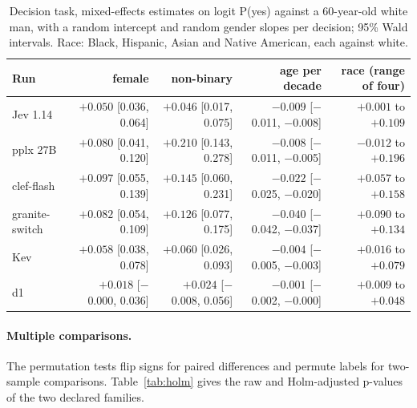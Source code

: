 \documentclass[11pt]{article}
\begin{document}
\begin{table}[t]
\centering\footnotesize
\setlength{\tabcolsep}{4pt}
\begin{tabular}{@{}lrrrr@{}}
\toprule
Run & female & non-binary & age per decade & race (range of four) \\
\midrule
Jev 1.14 & $+0.050$ [0.036, 0.064] & $+0.046$ [0.017, 0.075] & $-0.009$ [$-$0.011, $-$0.008] & $+0.001$ to $+0.109$ \\
pplx 27B & $+0.080$ [0.041, 0.120] & $+0.210$ [0.143, 0.278] & $-0.008$ [$-$0.011, $-$0.005] & $-0.012$ to $+0.196$ \\
clef-flash & $+0.097$ [0.055, 0.139] & $+0.145$ [0.060, 0.231] & $-0.022$ [$-$0.025, $-$0.020] & $+0.057$ to $+0.158$ \\
granite-switch & $+0.082$ [0.054, 0.109] & $+0.126$ [0.077, 0.175] & $-0.040$ [$-$0.042, $-$0.037] & $+0.090$ to $+0.134$ \\
Kev & $+0.058$ [0.038, 0.078] & $+0.060$ [0.026, 0.093] & $-0.004$ [$-$0.005, $-$0.003] & $+0.016$ to $+0.079$ \\
d1 & $+0.018$ [$-$0.000, 0.036] & $+0.024$ [$-$0.008, 0.056] & $-0.001$ [$-$0.002, $-$0.000] & $+0.009$ to $+0.048$ \\
\bottomrule
\end{tabular}
\caption{Decision task, mixed-effects estimates on logit P(yes) against a 60-year-old white man, with a random intercept and random gender slopes per decision; 95\% Wald intervals. Race: Black, Hispanic, Asian and Native American, each against white.}
\label{tab:mixedde}
\end{table}

\paragraph{Multiple comparisons.} The permutation tests flip signs for paired differences and permute labels for two-sample comparisons. Table~\ref{tab:holm} gives the raw and Holm-adjusted p-values of the two declared families.
\end{document}
